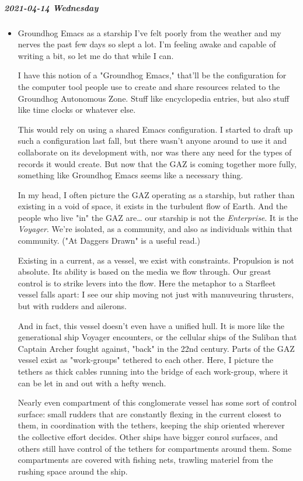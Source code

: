 \documentclass[11pt]{article}
\begin{document}
\subparagraph*{2021-04-14 Wednesday}
\label{sec:org5262e3b}
\begin{itemize}
\item Groundhog Emacs as a starship
\label{sec:orga13def5}
I've felt poorly from the weather and my nerves the past few days so slept a lot. I'm feeling awake and capable of writing a bit, so let me do that while I can.

I have this notion of a "Groundhog Emacs," that'll be the configuration for the computer tool people use to create and share resources related to the Groundhog Autonomous Zone. Stuff like encyclopedia entries, but also stuff like time clocks or whatever else.

This would rely on using a shared Emacs configuration. I started to draft up such a configuration last fall, but there wasn't anyone around to use it and collaborate on its development with, nor was there any need for the types of records it would create. But now that the GAZ is coming together more fully, something like Groundhog Emacs seems like a necessary thing.

In my head, I often picture the GAZ operating as a starship, but rather than existing in a void of space, it exists in the turbulent flow of Earth. And the people who live "in" the GAZ are\ldots{} our starship is not the \emph{Enterprise}. It is the \emph{Voyager}. We're isolated, as a community, and also as individuals within that community. ("At Daggers Drawn" is a useful read.)

Existing in a current, as a vessel, we exist with constraints. Propulsion is not absolute. Its ability is based on the media we flow through. Our greast control is to strike levers into the flow. Here the metaphor to a Starfleet vessel falls apart: I see our ship moving not just with manuveuring thrusters, but with rudders and ailerons.

And in fact, this vessel doesn't even have a unified hull. It is more like the generational ship Voyager encounters, or the cellular ships of the Suliban that Captain Archer fought against, "back" in the 22nd century. Parts of the GAZ vessel exist as "work-groups" tethered to each other. Here, I picture the tethers as thick cables running into the bridge of each work-group, where it can be let in and out with a hefty wench.

Nearly even compartment of this conglomerate vessel has some sort of control surface: small rudders that are constantly flexing in the current closest to them, in coordination with the tethers, keeping the ship oriented wherever the collective effort decides. Other ships have bigger conrol surfaces, and others still have control of the tethers for compartments around them. Some compartments are covered with fishing nets, trawling materiel from the rushing space around the ship.


\end{itemize}
\end{document}
